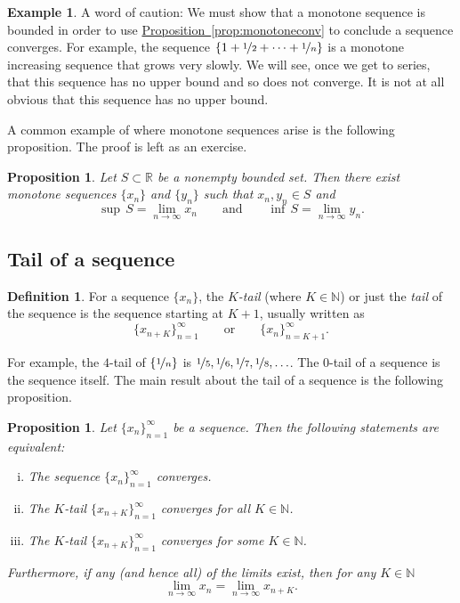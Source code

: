 \documentclass[12pt]{book}
\newcommand{\R}{{\mathbb{R}}}
\newcommand{\N}{{\mathbb{N}}}
\theoremstyle{plain}
\newtheorem{prop}[thm]{Proposition}
\theoremstyle{remark}
\theoremstyle{definition}
\newtheorem{defn}[thm]{Definition}
\theoremstyle{exercise}
\theoremstyle{example}
\newtheorem{example}[thm]{Example}
\newcommand{\propref}[1]{\hyperref[#1]{Proposition~\ref*{#1}}}
\begin{document}
\begin{example}
A word of caution:  We must show that a monotone sequence is bounded
in order to use \propref{prop:monotoneconv} to conclude a sequence converges.
For
example, 
the sequence $\{ 1 + \nicefrac{1}{2} + \cdots + \nicefrac{1}{n} \}$
is a monotone increasing
sequence that grows very slowly.  We will see, once we get to series,
that this sequence has no upper bound and so does not converge.  It is not
at all obvious that this sequence has no upper bound.
\end{example}

A common example of where monotone sequences arise is the following
proposition.  The proof is left as an exercise.

\begin{prop} \label{prop:supinfseq}
Let $S \subset \R$ be a nonempty bounded set.
Then there exist monotone sequences
$\{ x_n \}$ and $\{ y_n \}$ such that $x_n, y_n \in S$ and
\begin{equation*}
\sup\,S = \lim_{n\to \infty} x_n \qquad \text{and} \qquad \inf\,S =
\lim_{n\to\infty} y_n .
\end{equation*}
\end{prop}

\subsection{Tail of a sequence}

\begin{defn}
For a sequence $\{ x_n \}$,
the \emph{$K$-tail} (where $K \in \N$)
or just the
\emph{tail} of
the sequence is the sequence starting at $K+1$, usually written as
\begin{equation*}
\{ x_{n+K} \}_{n=1}^\infty
\qquad \text{or} \qquad \{ x_n \}_{n=K+1}^\infty .
\end{equation*}
\end{defn}
For example, the $4$-tail of $\{ \nicefrac{1}{n} \}$ is
$\nicefrac{1}{5}, \nicefrac{1}{6}, \nicefrac{1}{7}, \nicefrac{1}{8},
\ldots$.  The $0$-tail of a sequence is the sequence itself.
The main result about the tail of a sequence is the following proposition.

\begin{prop}
Let $\{ x_n \}_{n=1}^\infty$ be a sequence.  Then the following
statements are equivalent:
\begin{enumerate}[(i)]
\item \label{prop:ktail:i}
The sequence $\{ x_n \}_{n=1}^\infty$ converges.
\item \label{prop:ktail:ii}
The $K$-tail $\{ x_{n+K} \}_{n=1}^\infty$ converges for all $K \in \N$.
\item \label{prop:ktail:iii}
The $K$-tail $\{ x_{n+K} \}_{n=1}^\infty$ converges for some $K \in \N$.
\end{enumerate}
Furthermore, if any (and hence all) of the limits exist, then for any $K \in \N$
\begin{equation*}
\lim_{n\to \infty} x_n = \lim_{n \to \infty} x_{n+K} .
\end{equation*}
\end{prop}
\end{document}

